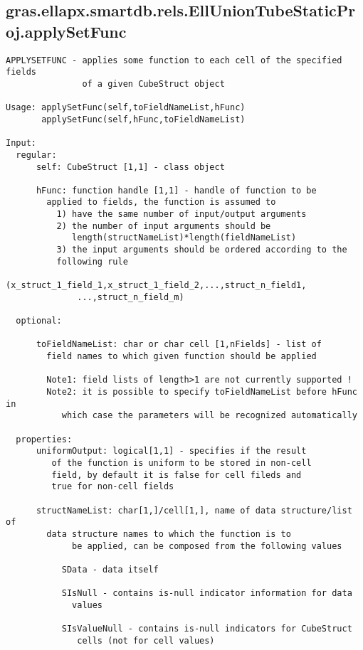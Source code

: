 \subsection{\texorpdfstring{gras.ellapx.smartdb.rels.EllUnionTubeStaticProj.applySetFunc}{applySetFunc}}\label{method:gras.ellapx.smartdb.rels.EllUnionTubeStaticProj.applySetFunc}
\begin{verbatim}
APPLYSETFUNC - applies some function to each cell of the specified fields
               of a given CubeStruct object

Usage: applySetFunc(self,toFieldNameList,hFunc)
       applySetFunc(self,hFunc,toFieldNameList)

Input:
  regular:
      self: CubeStruct [1,1] - class object

      hFunc: function handle [1,1] - handle of function to be
        applied to fields, the function is assumed to
          1) have the same number of input/output arguments
          2) the number of input arguments should be
             length(structNameList)*length(fieldNameList)
          3) the input arguments should be ordered according to the
          following rule
              (x_struct_1_field_1,x_struct_1_field_2,...,struct_n_field1,
              ...,struct_n_field_m)

  optional:

      toFieldNameList: char or char cell [1,nFields] - list of
        field names to which given function should be applied

        Note1: field lists of length>1 are not currently supported !
        Note2: it is possible to specify toFieldNameList before hFunc in
           which case the parameters will be recognized automatically

  properties:
      uniformOutput: logical[1,1] - specifies if the result
         of the function is uniform to be stored in non-cell
         field, by default it is false for cell fileds and
         true for non-cell fields

      structNameList: char[1,]/cell[1,], name of data structure/list of
        data structure names to which the function is to
             be applied, can be composed from the following values

           SData - data itself

           SIsNull - contains is-null indicator information for data
             values

           SIsValueNull - contains is-null indicators for CubeStruct
              cells (not for cell values)


\end{verbatim}

